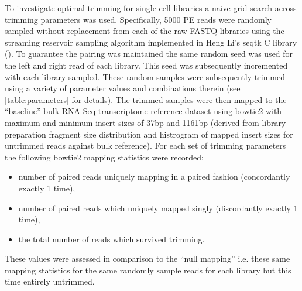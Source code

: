To investigate optimal trimming for single cell libraries a naive grid search across trimming parameters was used.
Specifically, 5000 PE reads were randomly sampled without replacement from each of the raw FASTQ libraries 
using the streaming reservoir sampling \citep{Vitter1985} algorithm implemented in Heng Li's 
seqtk C library (\citep{SeqtkGitHub}).
To guarantee the pairing was maintained the same random seed was used for the left and right read
of each library. This seed was subsequently incremented with each library sampled.
These random samples were subsequently trimmed using a variety of parameter values and combinations therein 
(see \ref{table:parameters} for details).
The trimmed samples were then mapped to the ``baseline'' bulk RNA-Seq transcriptome reference dataset using bowtie2
\citep{Langmead2012} with maximum and minimum insert sizes of 37bp and 1161bp (derived from library preparation
fragment size distribution and histrogram of mapped insert sizes for untrimmed reads against bulk reference).
For each set of trimming parameters the following bowtie2 mapping statistics were recorded: 
\begin{itemize}
    \item number of paired reads uniquely mapping in a paired 
fashion (concordantly exactly 1 time), 
    \item number of paired reads which uniquely mapped 
singly (discordantly exactly 1 time), 
    \item the total number of reads which survived trimming.
\end{itemize}

These values were assessed in comparison to the ``null mapping'' i.e. these same mapping statistics for the same
randomly sample reads for each library but this time entirely untrimmed.  

%
%
%
%
%
%

